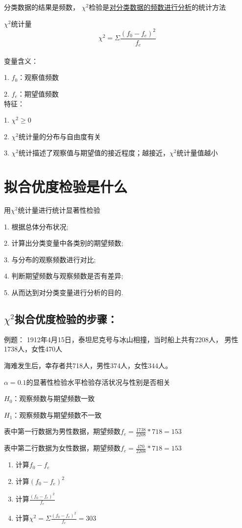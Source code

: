 \documentclass[UTF8,10pt]{book}
\begin{document}
{分类数据的结果是频数， $\chi^2$检验是\underline{对分类数据的频数进行分析}的统计方法		

$\chi^2$统计量	$$\chi^2 = \Sigma \frac{(f_0-f_e)^2}{f_e}$$ 
\\

变量含义： 

1. $f_0$：观察值频数 

2. $f_e$：期望值频数 
\\

特征： 

1. $\chi^2 \geq 0$ 

2. $\chi^2$统计量的分布与自由度有关 

3. $\chi^2$统计描述了观察值与期望值的接近程度；越接近，$\chi^2$统计量值越小	

\section{拟合优度检验是什么}	
用$\chi^2$统计量进行统计显著性检验 

1. 根据总体分布状况; 

2. 计算出分类变量中各类别的期望频数; 

3. 与分布的观察频数进行对比; 

4. 判断期望频数与观察频数是否有差异; 

5. 从而达到对分类变量进行分析的目的.	

\subsection{$\chi^2$拟合优度检验的步骤：} 
例题：
1912年4月15日，泰坦尼克号与冰山相撞，当时船上共有2208人，
男性1738人，女性470人 

海难发生后，幸存者共718人，男性374人，女性344人。

$\alpha=0.1$的显著性检验水平检验存活状况与性别是否相关	

$H_0$：观察频数与期望频数一致 

$H_1$：观察频数与期望频数不一致 

表中第一行数据为男性数据，期望频数$f_e = \frac{1738}{2208} * 718 = 153$ 

表中第二行数据为女性数据，期望频数$f_e = \frac{470}{2208} * 718 = 153$ 


\begin{enumerate}
	\item 计算$f_0 -f_e$ 
	\item 计算$(f_0 -f_e)^2$ 
	\item 计算$\frac{(f_0 -f_e)^2}{f_e}$ 
	\item 计算$\chi^2 = \Sigma \frac{(f_0-f_e)^2}{f_e} = 303 $
	

\end{enumerate}}
\end{document}
